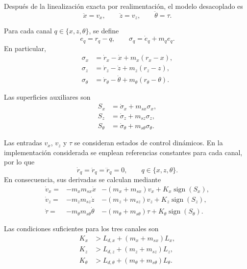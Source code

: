 Después de la linealización exacta por realimentación, el modelo desacoplado
es
\[
  \ddot x=v_x,\qquad
  \ddot z=v_z,\qquad
  \ddot\theta=\tau.
\]

Para cada canal \(q\in\{x,z,\theta\}\), se define
\[
  e_q=r_q-q,
  \qquad
  \sigma_q=\dot e_q+m_qe_q.
\]
En particular,
\begin{align*}
  \sigma_x&=\dot r_x-\dot x+m_x(r_x-x),\\
  \sigma_z&=\dot r_z-\dot z+m_z(r_z-z),\\
  \sigma_\theta&=\dot r_\theta-\dot\theta
  +m_\theta(r_\theta-\theta).
\end{align*}

Las superficies auxiliares son
\begin{align*}
  S_x&=\dot\sigma_x+m_{sx}\sigma_x,\\
  S_z&=\dot\sigma_z+m_{sz}\sigma_z,\\
  S_\theta&=\dot\sigma_\theta+m_{s\theta}\sigma_\theta.
\end{align*}

Las entradas \(v_x\), \(v_z\) y \(\tau\) se consideran estados de control
dinámicos. En la implementación considerada se emplean referencias
constantes para cada canal, por lo que
\[
  \dot r_q=\ddot r_q=\dddot r_q=0,
  \qquad q\in\{x,z,\theta\}.
\]
En consecuencia, sus derivadas se calculan mediante
\begin{align*}
  \dot v_x={}&
  -m_xm_{sx}\dot x
  &-(m_x+m_{sx})v_x
  +K_x\operatorname{sign}(S_x),\\
  \dot v_z={}&
  -m_zm_{sz}\dot z
  &-(m_z+m_{sz})v_z
  +K_z\operatorname{sign}(S_z),\\
  \dot\tau={}&
  -m_\theta m_{s\theta}\dot\theta
  &-(m_\theta+m_{s\theta})\tau
  +K_\theta\operatorname{sign}(S_\theta).
\end{align*}

Las condiciones suficientes para los tres canales son
\[
\begin{aligned}
  K_x&>L_{d,x}+(m_x+m_{sx})L_x,\\
  K_z&>L_{d,z}+(m_z+m_{sz})L_z,\\
  K_\theta&>L_{d,\theta}
  +(m_\theta+m_{s\theta})L_\theta.
\end{aligned}
\]